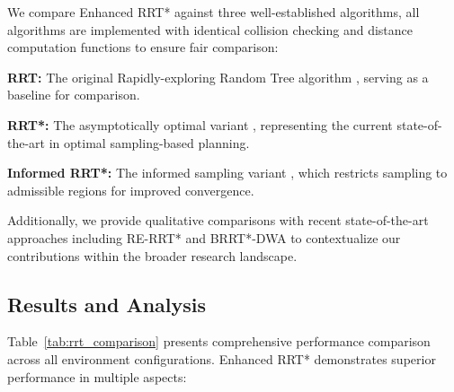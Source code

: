 \documentclass[pdflatex,sn-mathphys-num]{sn-jnl}
\theoremstyle{thmstyleone}%
\theoremstyle{thmstyletwo}%
\theoremstyle{thmstylethree}%
\begin{document}
We compare Enhanced RRT* against three well-established algorithms, all algorithms are implemented with identical collision checking and distance computation functions to ensure fair comparison:

{
\setlength{\parindent}{0pt}
\textbf{RRT:} The original Rapidly-exploring Random Tree algorithm \cite{7}, serving as a baseline for comparison.
    
\textbf{RRT*:} The asymptotically optimal variant \cite{8}, representing the current state-of-the-art in optimal sampling-based planning.
    
\textbf{Informed RRT*:} The informed sampling variant \cite{14}, which restricts sampling to admissible regions for improved convergence.}


Additionally, we provide qualitative comparisons with recent state-of-the-art approaches including RE-RRT* \cite{29} and BRRT*-DWA \cite{30} to contextualize our contributions within the broader research landscape.

\subsection{Results and Analysis}\label{subsec3}

Table~\ref{tab:rrt_comparison} presents comprehensive performance comparison across all environment configurations. Enhanced RRT* demonstrates superior performance in multiple aspects:
\end{document}
